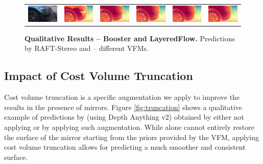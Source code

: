 \begin{figure}[h]
\begin{tabular}{cccccc}
    \includegraphics[width=0.16\linewidth]{imgs/multiple_vfms/layered/337.jpg} &
    \includegraphics[width=0.16\linewidth]{imgs/multiple_vfms/layered/337_raft.jpg} &
    \includegraphics[width=0.16\linewidth]{imgs/multiple_vfms/layered/337_dav2.jpg} &
    \includegraphics[width=0.16\linewidth]{imgs/multiple_vfms/layered/337_depthpro.jpg} &
    \includegraphics[width=0.16\linewidth]{imgs/multiple_vfms/layered/337_moge.jpg} &
    \includegraphics[width=0.16\linewidth]{imgs/multiple_vfms/layered/337_lotus.jpg} \\
    
    \end{tabular}\vspace{-0.3cm}
    \caption{\textbf{Qualitative Results -- Booster and LayeredFlow.} Predictions by RAFT-Stereo and \method{} -- different VFMs.}
    \label{fig:multiple_vfms}\vspace{-0.3cm}
\end{figure}

\subsection{Impact of Cost Volume Truncation}
\label{subsec:vol_trunc_qual}

Cost volume truncation is a specific augmentation we apply to improve the results in the presence of mirrors. Figure \ref{fig:truncation} shows a qualitative example of predictions by \method (using Depth Anything v2) obtained by either not applying or by applying such augmentation. 
While \method alone cannot entirely restore the surface of the mirror starting from the priors provided by the VFM, applying cost volume truncation allows for predicting a much smoother and consistent surface.

